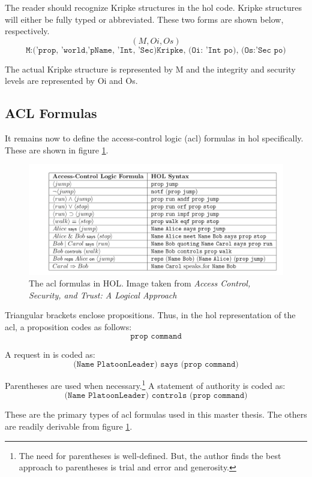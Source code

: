 \documentclass[../../main/main.tex]{subfiles}
\begin{document}
The reader should recognize Kripke structures in the \gls{hol} code.  Kripke structures will either be fully typed or abbreviated.  These two forms are shown below, respectively.  
\[ (M, Oi, Os) \]
\[ \texttt{M:('prop, 'world,'pName, 'Int, 'Sec)Kripke, (Oi: 'Int po), (Os:'Sec po)} \]

The actual Kripke structure is represented by M and the integrity and security levels are represented by Oi and Os.  

\subsection{ACL Formulas}
It remains now to define the access-control logic (\gls{acl}) formulas in \gls{hol} specifically.  These are shown in figure \ref{aclformulasHOL}.

\begin{figure}[h]
\centering
\includegraphics[width=\textwidth]{../figures/aclformulasHOL}
\caption{\label{aclformulasHOL}The \gls{acl} formulas in HOL.  Image taken from \textit{Access Control, Security, and Trust: A Logical Approach}\cite{ChinOlder}}
\end{figure}


Triangular brackets enclose propositions.  Thus, in the \gls{hol} representation of the \gls{acl}, a proposition codes as follows:
\[\texttt{prop command} \]

A request in  is coded as: 
\[ \texttt{(Name PlatoonLeader) says (prop command)} \]

Parentheses are used when necessary.\footnote{The need for parentheses is well-defined.  But, the author finds the best approach to parentheses is trial and error and generosity.}  A statement of authority is coded as:
\[ \texttt{(Name PlatoonLeader) controls (prop command)} \]

These are the primary types of \gls{acl} formulas used in this master thesis.  The others are readily derivable from figure \ref{aclformulasHOL}.
\end{document}
